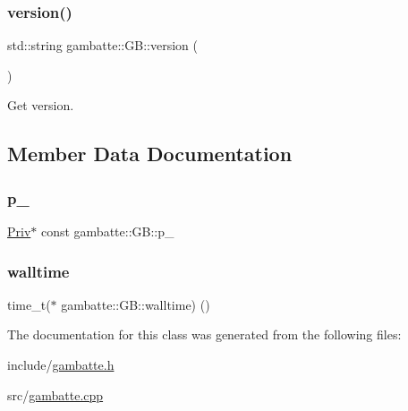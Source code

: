 \subsubsection{\texorpdfstring{version()}{version()}}
{\footnotesize\ttfamily std\+::string gambatte\+::\+G\+B\+::version (\begin{DoxyParamCaption}{ }\end{DoxyParamCaption})\hspace{0.3cm}{\ttfamily [static]}}

Get version. 

\subsection{Member Data Documentation}
\mbox{\label{classgambatte_1_1GB_a648f96b5ea58e1d6c8013c8897e63218}} 
\subsubsection{\texorpdfstring{p\+\_\+}{p\_}}
{\footnotesize\ttfamily \hyperlink{structgambatte_1_1GB_1_1Priv}{Priv}$\ast$ const gambatte\+::\+G\+B\+::p\+\_\+\hspace{0.3cm}{\ttfamily [private]}}

\mbox{\label{classgambatte_1_1GB_a3b230d27feb2c167823bce8cfc6b02af}} 
\subsubsection{\texorpdfstring{walltime}{walltime}}
{\footnotesize\ttfamily time\+\_\+t($\ast$ gambatte\+::\+G\+B\+::walltime) ()\hspace{0.3cm}{\ttfamily [private]}}



The documentation for this class was generated from the following files\+:\begin{DoxyCompactItemize}
\item 
include/\hyperlink{gambatte_8h}{gambatte.\+h}\item 
src/\hyperlink{gambatte_8cpp}{gambatte.\+cpp}\end{DoxyCompactItemize}

